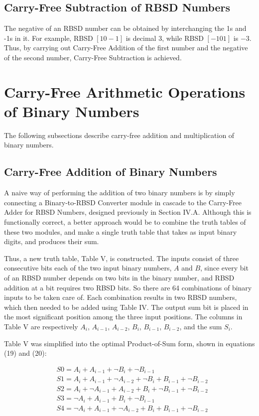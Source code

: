 \documentclass[conference]{IEEEtran_NCC}
\begin{document}
\subsection{Carry-Free Subtraction of RBSD Numbers}

The negative of an RBSD number can be obtained by interchanging the 1s and -1s in it. For example, RBSD $[1 0 -1]$ is decimal $3$, while RBSD $[-1 0 1]$ is $-3$. Thus, by carrying out Carry-Free Addition of the first number and the negative of the second number, Carry-Free Subtraction is achieved.

\section{Carry-Free Arithmetic Operations of Binary Numbers}

The following subsections describe carry-free addition and multiplication of binary numbers.

\subsection{Carry-Free Addition of Binary Numbers}

A naive way of performing the addition of two binary numbers is by simply connecting a Binary-to-RBSD Converter module in cascade to the Carry-Free Adder for RBSD Numbers, designed previously in Section IV.A. Although this is functionally correct, a better approach would be to combine the truth tables of these two modules, and make a single truth table that takes as input binary digits, and produces their sum.

Thus, a new truth table, Table V, is constructed. The inputs consist of three consecutive bits each of the two input binary numbers, $A$ and $B$, since every bit of an RBSD number depends on two bits in the binary number, and RBSD addition at a bit requires two RBSD bits. So there are 64 combinations of binary inputs to be taken care of. Each combination results in two RBSD numbers, which then needed to be added using Table IV. The output sum bit is placed in the most significant position among the three input positions. The columns in Table V are respectively $A_{i}$, $A_{i-1}$, $A_{i-2}$, $B_{i}$, $B_{i-1}$, $B_{i-2}$, and the sum $S_{i}$.

Table V was simplified into the optimal Product-of-Sum form, shown in equations (19) and (20):

\vspace{-1em}
\begin{align}
&S0 = A_{i} + A_{i-1} + \neg  B_{i} + \neg B_{i-1}\\
&S1 = A_{i} + A_{i-1} + \neg A_{i-2} + \neg B_{i} + B_{i-1} + \neg B_{i-2}\\
&S2 = A_{i} + \neg A_{i-1} + A_{i-2} + B_{i} + \neg B_{i-1} + \neg B_{i-2}\\
&S3 = \neg A_{i} + A_{i-1}   + B_{i} + \neg B_{i-1}\\
&S4 = \neg A_{i} + A_{i-1} + \neg A_{i-2} + B_{i} + B_{i-1} + \neg B_{i-2}
\end{align}
\end{document}
